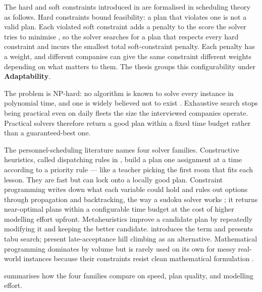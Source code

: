 The hard and soft constraints introduced in  are formalised in scheduling theory as follows. Hard constraints bound feasibility: a plan that violates one is not a valid plan. Each violated soft constraint adds a penalty to the score the solver tries to minimise \parencite{ernst2004staff, rossi2006constraint}, so the solver searches for a plan that respects every hard constraint and incurs the smallest total soft-constraint penalty. Each penalty has a weight, and different companies can give the same constraint different weights depending on what matters to them. The thesis groups this configurability under \textbf{Adaptability}.

The problem is NP-hard: no algorithm is known to solve every instance in polynomial time, and one is widely believed not to exist \parencite{rossi2006constraint, pinedo2016scheduling}. Exhaustive search stops being practical even on daily fleets the size the interviewed companies operate. Practical solvers therefore return a good plan within a fixed time budget rather than a guaranteed-best one.

The personnel-scheduling literature names four solver families. Constructive heuristics, called dispatching rules in \textcite{pinedo2016scheduling}, build a plan one assignment at a time according to a priority rule --- like a teacher picking the first room that fits each lesson. They are fast but can lock onto a locally good plan. Constraint programming writes down what each variable could hold and rules out options through propagation and backtracking, the way a sudoku solver works \parencite{rossi2006constraint}; it returns near-optimal plans within a configurable time budget at the cost of higher modelling effort upfront. Metaheuristics improve a candidate plan by repeatedly modifying it and keeping the better candidate. \textcite{glover1986future} introduces the term and presents tabu search; \textcite{burke2017late} present late-acceptance hill climbing as an alternative. Mathematical programming dominates by volume but is rarely used on its own for messy real-world instances because their constraints resist clean mathematical formulation \parencite[pp.~17--18]{ernst2004staff}.





 summarises how the four families compare on speed, plan quality, and modelling effort.

